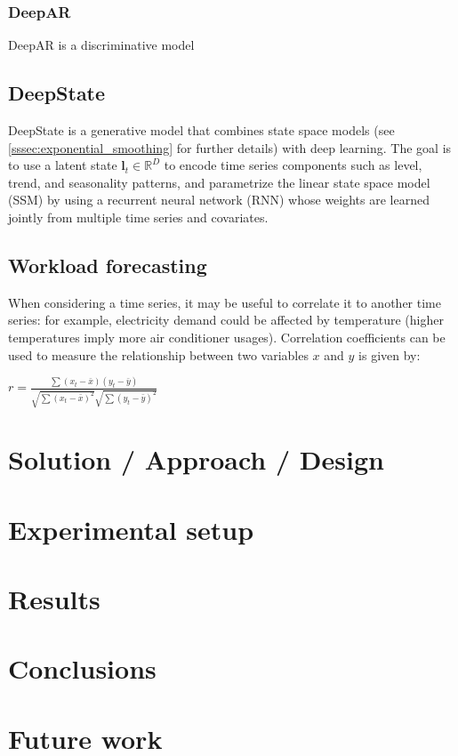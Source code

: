 \documentclass[a4paper]{article} %
\begin{document}
	\subsubsection{ DeepAR }
	DeepAR is a discriminative model 
	
	\subsection{ DeepState }
	DeepState is a generative model that combines state space models \cite{ExponentialSmoothingStateSpace} (see \ref{sssec:exponential_smoothing} for further details) with deep learning. The goal is to use a latent state $\pmb{l}_t \in \mathbb{R}^D$ to encode time series components such as level, trend, and seasonality patterns, and parametrize the linear state space model (SSM) by using a recurrent neural network (RNN) whose weights are learned jointly from multiple time series and covariates. 
	
	\subsection{ Workload forecasting }
		When considering a time series, it may be useful to correlate it to another time series: for example, electricity demand could be affected by temperature (higher temperatures imply more air conditioner usages).  Correlation coefficients can be used to measure the relationship between two variables $x$ and $y$ is given by:
	
	$r = \frac{\sum{(x_t - \bar x)(y_t - \bar y)}}{\sqrt{\sum{(x_t - \bar x)^2}}\sqrt{\sum{(y_t - \bar y)^2}}}$
	
	\section{ Solution / Approach / Design }
	
	\section{ Experimental setup }
	
	\section{ Results }
	
	\section{ Conclusions }
	
	\section{ Future work }
		
	
	\newpage
	 
	
	
	
\end{document}
